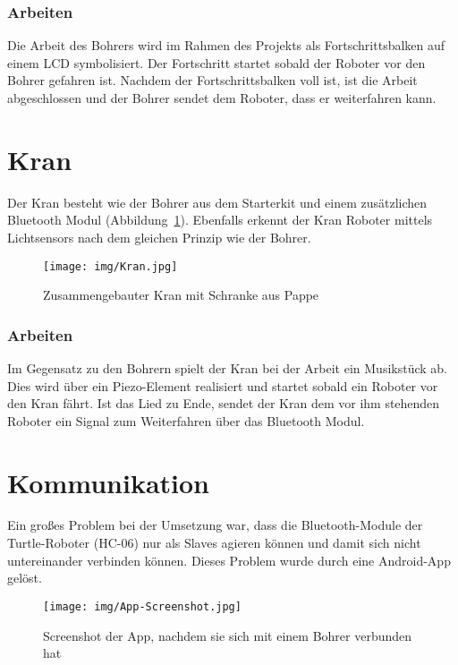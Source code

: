\subsubsection{Arbeiten}
Die Arbeit des Bohrers wird im Rahmen des Projekts als Fortschrittsbalken auf einem LCD symbolisiert. Der Fortschritt startet sobald der Roboter vor den Bohrer gefahren ist. Nachdem der Fortschrittsbalken voll ist, ist die Arbeit abgeschlossen und der Bohrer sendet dem Roboter, dass er weiterfahren kann.

\section{Kran}
Der Kran besteht wie der Bohrer aus dem Starterkit und einem zusätzlichen Bluetooth Modul (Abbildung~\ref{kran_img}). Ebenfalls erkennt der Kran Roboter mittels Lichtsensors nach dem gleichen Prinzip wie der Bohrer.
\begin{figure}[h]
\begin{center}
\texttt{[image: img/Kran.jpg]}
\caption{Zusammengebauter Kran mit Schranke aus Pappe} \label{kran_img}
\end{center}
\end{figure}
\subsubsection{Arbeiten}
Im Gegensatz zu den Bohrern spielt der Kran bei der Arbeit ein Musikstück ab. Dies wird über ein Piezo-Element realisiert und startet sobald ein Roboter vor den Kran fährt. Ist das Lied zu Ende, sendet der Kran dem vor ihm stehenden Roboter ein Signal zum Weiterfahren über das Bluetooth Modul.

\section{Kommunikation}
Ein großes Problem bei der Umsetzung war, dass die Bluetooth-Module der Turtle-Roboter (HC-06) nur als Slaves agieren können und damit sich nicht untereinander verbinden können. Dieses Problem wurde durch eine Android-App gelöst.
\begin{figure}[h]
\begin{center}
\texttt{[image: img/App-Screenshot.jpg]}
\caption{Screenshot der App, nachdem sie sich mit einem Bohrer verbunden hat}\label{screen_app}
\end{center}
\end{figure}

